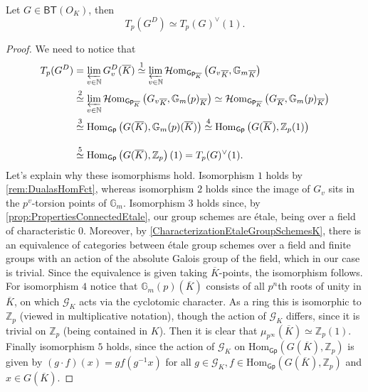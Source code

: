 \begin{prop}[]\label{TateModuleDuals}
	Let $G \in \mathsf{BT}(O_K)$, then
	\begin{equation*}
		T_p(G^D) \simeq T_p(G)^\vee(1)
	.\end{equation*}
\end{prop}
\begin{proof}
	We need to notice that
	\begin{align*}
		T_p(G^D) &= \varprojlim_{v \in \mathbb{N}} G_v^D(\overline{K})
		\stackrel{1}{\simeq} \varprojlim_{v \in \mathbb{N}}
		\mathcal{H}\mathrm{om}_{ \mathsf{Gp}_{\overline{K}} }
		\left( {G_v}_{\overline{K}}, {\mathbb{G}_m}_{\overline{K}} \right) \\
		&\stackrel{2}{\simeq} \varprojlim_{v \in \mathbb{N}}
		\mathcal{H}\mathrm{om}_{ \mathsf{Gp}_{\overline{K}} }
		\left( {G_v}_{\overline{K}}, {\mathbb{G}_m(p)}_{\overline{K}}\right)
		\simeq \mathcal{H}\mathrm{om}_{ \mathsf{Gp}_{\overline{K}} }
		\left( {G}_{\overline{K}}, {\mathbb{G}_m(p)}_{\overline{K}} \right)\\
		&\stackrel{3}{\simeq} \mathrm{Hom}_{ \mathsf{Gp} } 
		\left( G(\overline{K}), \mathbb{G}_m(p)(\overline{K}) \right)
		\stackrel{4}{\simeq} \mathrm{Hom}_{ \mathsf{Gp} } 
		\left( G(\overline{K}), \mathbb{Z}_{p}(1) \right) 
		\phantom{\varprojlim_{v \in \mathbb{N}}}\\
		&\stackrel{5}{\simeq} \mathrm{Hom}_{ \mathsf{Gp} } 
		\left( G(\overline{K}), \mathbb{Z}_{p} \right)(1)
		= T_p(G)^\vee(1)
	.\end{align*}
	Let's explain why these isomorphisms hold.
	Isomorphism $1$ holds by \cref{rem:DualasHomFct}, whereas isomorphism $2$
	holds since the image of $G_v$ sits in the $p^v$-torsion points of $\mathbb{G}_m$.
	Isomorphism $3$ holds since, by \cref{prop:PropertiesConnectedEtale}, our group
	schemes are étale, being over a field of characteristic $0$.
	Moreover, by \cref{CharacterizationEtaleGroupSchemesK}, there is an equivalence of categories
	between étale group schemes over a field and finite groups with an action
	of the absolute Galois group of the field, which in our case is trivial.
	Since the equivalence is given taking $\overline{K}$-points, the isomorphism follows.
	For isomorphism $4$ notice that $\mathbb{G}_m(p)(\overline{K})$ consists of all
	$p^n$th roots of unity in $\overline{K}$, on which $\mathscr{G}_K$ acts via the cyclotomic character.
	As a ring this is isomorphic to $\mathbb{Z}_{p}$ (viewed in multiplicative notation),
	though the action of $\mathscr{G}_K$ differs, since
	it is trivial on $\mathbb{Z}_{p}$ (being contained in $K$).
	Then it is clear that $\mu_{p^\infty}(\overline{K}) \simeq \mathbb{Z}_{p}(1)$.
	Finally isomorphism $5$ holds, since the action of $\mathscr{G}_K$ on 
	$\mathrm{Hom}_{ \mathsf{Gp} } \left( G(\overline{K}), \mathbb{Z}_{p} \right)$
	is given by $(g \cdot f)(x) = gf(g^{-1}x)$ for all $g \in \mathscr{G}_K, 
	f \in \mathrm{Hom}_{\mathsf{Gp}} \left( G(\overline{K}), \mathbb{Z}_{p} \right)$
	and $x \in G(\overline{K})$.
\end{proof}
